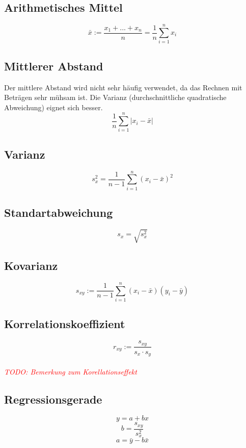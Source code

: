 \documentclass[12pt]{article}
\newcommand\todo[1]{\textit{\textcolor{red}{\\TODO: #1}}}
\begin{document}
\subsection{Arithmetisches Mittel}
\begin{equation*}
	\bar{x} := \frac{x_1 + ... + x_n}{n} = \frac{1}{n}\sum_{i=1}^{n}{x_i}
\end{equation*}
\subsection{Mittlerer Abstand}
Der mittlere Abstand wird nicht sehr häufig verwendet, da das Rechnen mit Beträgen sehr mühsam ist. Die Varianz (durchschnittliche quadratische Abweichung) eignet sich besser.
\begin{equation*}
	\frac{1}{n}\sum_{i=1}^{n}{|x_i-\bar{x}|}
\end{equation*}
\subsection{Varianz}
\begin{equation*}
	s_x^2= \frac{1}{n-1}\sum_{i=1}^n{(x_i-\bar{x})^2}
\end{equation*}
\subsection{Standartabweichung}
\begin{equation*}
	s_x = \sqrt{s_x^2}
\end{equation*}
\subsection{Kovarianz}
\begin{equation*}
	s_{xy}:=\frac{1}{n-1}\sum_{i=1}^n(x_i-\bar{x})(y_i-\bar{y})
\end{equation*}
\subsection{Korrelationskoeffizient}
\begin{equation*}
	r_{xy}:=\frac{s_{xy}}{s_x\cdot s_y}
\end{equation*}
\todo{Bemerkung zum Korellationseffekt}
\subsection{Regressionsgerade}
\begin{equation*}
	y = a + bx
\end{equation*}
\begin{equation*}
	b = \frac{s_{xy}}{s_x^2}
\end{equation*}
\begin{equation*}
	a = \bar{y} - b\bar{x}
\end{equation*}
\end{document}
